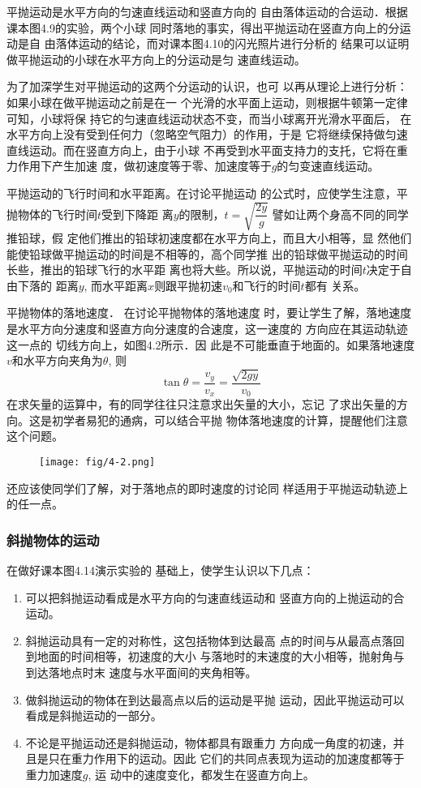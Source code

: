 平抛运动是水平方向的匀速直线运动和竖直方向的
自由落体运动的合运动．根据课本图4.9的实验，两个小球
同时落地的事实，得出平抛运动在竖直方向上的分运动是自
由落体运动的结论，而对课本图4.10的闪光照片进行分析的
结果可以证明做平抛运动的小球在水平方向上的分运动是匀
速直线运动。

为了加深学生对平抛运动的这两个分运动的认识，也可
以再从理论上进行分析：如果小球在做平抛运动之前是在一
个光滑的水平面上运动，则根据牛顿第一定律可知，小球将保
持它的匀速直线运动状态不变，而当小球离开光滑水平面后，
在水平方向上没有受到任何力（忽略空气阻力）的作用，于是
它将继续保持做匀速直线运动。而在竖直方向上，由于小球
不再受到水平面支持力的支托，它将在重力作用下产生加速
度，做初速度等于零、加速度等于$g$的匀变速直线运动。

平抛运动的飞行时间和水平距离。在讨论平抛运动
的公式时，应使学生注意，平抛物体的飞行时间$t$受到下降距
离$y$的限制，$t=\sqrt{\dfrac{2y}{g}}$
譬如让两个身高不同的同学推铅球，假
定他们推出的铅球初速度都在水平方向上，而且大小相等，显
然他们能使铅球做平抛运动的时间是不相等的，高个同学推
出的铅球做平抛运动的时间长些，推出的铅球飞行的水平距
离也将大些。所以说，平抛运动的时间$t$决定于自由下落的
距离$y$, 而水平距离$x$则跟平抛初速$v_0$和飞行的时间$t$都有
关系。

平抛物体的落地速度．
在讨论平抛物体的落地速度
时，要让学生了解，落地速度
是水平方向分速度和竖直方向分速度的合速度，这一速度的
方向应在其运动轨迹这一点的
切线方向上，如图4.2所示．因
此是不可能垂直于地面的。如果落地速度$v$和水平方向夹角为$\theta$, 则\[\tan\theta= \frac{v_y}{v_x}=\frac{\sqrt{2gy}}{v_0} \]
在求矢量的运算中，有的同学往往只注意求出矢量的大小，忘记
了求出矢量的方向。这是初学者易犯的通病，可以结合平抛
物体落地速度的计算，提醒他们注意这个问题。

\begin{figure}[htp]
    \centering
\texttt{[image: fig/4-2.png]}
    \caption{}
\end{figure}

还应该使同学们了解，对于落地点的即时速度的讨论同
样适用于平抛运动轨迹上的任一点。

\subsubsection{斜抛物体的运动}

在做好课本图4.14演示实验的
基础上，使学生认识以下几点：
\begin{enumerate}
\item 可以把斜抛运动看成是水平方向的匀速直线运动和
竖直方向的上抛运动的合运动。
\item 斜抛运动具有一定的对称性，这包括物体到达最高
点的时间与从最高点落回到地面的时间相等，初速度的大小
与落地时的末速度的大小相等，抛射角与到达落地点时末
速度与水平面间的夹角相等。
\item 做斜抛运动的物体在到达最高点以后的运动是平抛
运动，因此平抛运动可以看成是斜抛运动的一部分。
\item 不论是平抛运动还是斜抛运动，物体都具有跟重力
方向成一角度的初速，并且是只在重力作用下的运动。因此
它们的共同点表现为运动的加速度都等于重力加速度$g$, 运
动中的速度变化，都发生在竖直方向上。
\end{enumerate}

